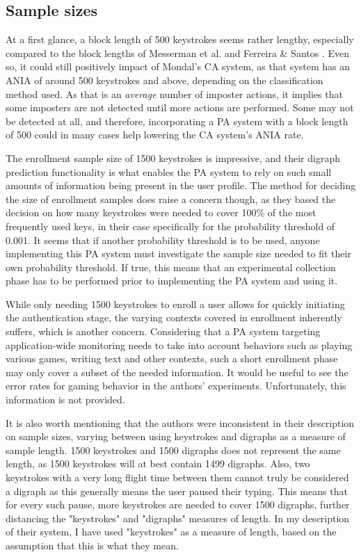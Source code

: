 \documentclass[informationsecurity]{gucmasterproject}
\begin{document}
\subsection{Sample sizes}
\label{sec:ahmed-discussion-sample}
At a first glance, a block length of 500 keystrokes seems rather lengthy, especially compared to the block lengths of Messerman et al. \cite{Messerman} and Ferreira \& Santos \cite{superResults}.
Even so, it could still positively impact of Mondal's \cite{mondal} CA system, as that system has an ANIA of around 500 keystrokes and above, depending on the classification method used.
As that is an \textit{average} number of imposter actions, it implies that some imposters are not detected until more actions are performed.
Some may not be detected at all, and therefore, incorporating a PA system with a block length of 500 could in many cases help lowering the CA system's ANIA rate.

The enrollment sample size of 1500 keystrokes is impressive, and their digraph prediction functionality is what enables the PA system to rely on such small amounts of information being present in the user profile.
The method for deciding the size of enrollment samples does raise a concern though, as they based the decision on how many keystrokes were needed to cover 100\% of the most frequently used keys, in their case specifically for the probability threshold of 0.001.
It seems that if another probability threshold is to be used, anyone implementing this PA system must investigate the sample size needed to fit their own probability threshold. 
If true, this means that an experimental collection phase has to be performed prior to implementing the PA system and using it.

While only needing 1500 keystrokes to enroll a user allows for quickly initiating the authentication stage, the varying contexts covered in enrollment inherently suffers, which is another concern.
Considering that a PA system targeting application-wide monitoring needs to take into account behaviors such as playing various games, writing text and other contexts, such a short enrollment phase may only cover a subset of the needed information.
It would be useful to see the error rates for gaming behavior in the authors' experiments.
Unfortunately, this information is not provided.

It is also worth mentioning that the authors were inconsistent in their description on sample sizes, varying between using keystrokes and digraphs as a measure of sample length.
1500 keystrokes and 1500 digraphs does not represent the same length, as 1500 keystrokes will at best contain 1499 digraphs.
Also, two keystrokes with a very long flight time between them cannot truly be considered a digraph as this generally means the user paused their typing. 
This means that for every such pause, more keystrokes are needed to cover 1500 digraphs, further distancing the "keystrokes" and "digraphs" measures of length.
In my description of their system, I have used "keystrokes" as a measure of length, based on the assumption that this is what they mean.
\end{document}

